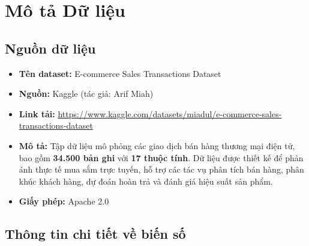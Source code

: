 \documentclass[12pt,a4paper]{article}
\begin{document}
\section{Mô tả Dữ liệu}

\subsection{Nguồn dữ liệu}

\begin{itemize}[leftmargin=1.5cm]
    \item \textbf{Tên dataset:} E-commerce Sales Transactions Dataset
    \item \textbf{Nguồn:} Kaggle (tác giả: Arif Miah)
    \item \textbf{Link tải:} \url{https://www.kaggle.com/datasets/miadul/e-commerce-sales-transactions-dataset}
    \item \textbf{Mô tả:} Tập dữ liệu mô phỏng các giao dịch bán hàng thương mại điện tử, bao gồm \textbf{34.500 bản ghi} với \textbf{17 thuộc tính}. Dữ liệu được thiết kế để phản ánh thực tế mua sắm trực tuyến, hỗ trợ các tác vụ phân tích bán hàng, phân khúc khách hàng, dự đoán hoàn trả và đánh giá hiệu suất sản phẩm.
    \item \textbf{Giấy phép:} Apache 2.0
\end{itemize}

\subsection{Thông tin chi tiết về biến số}
\end{document}
